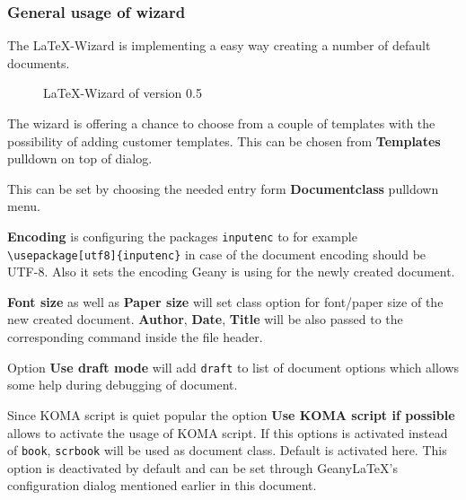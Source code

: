 \documentclass[%
paper=a4,%
fontsize=11pt,%
twoside=false,%
DIV18,%
headsepline,%
plainheadsepline,%
footsepline,%
plainfootsepline,%
bibliography=totoc,%
listof=totoc,%
BCOR10mm,%
parskip=half,%
openany,%
]{scrartcl}
\begin{document}
\subsubsection{General usage of wizard}
The \LaTeX-Wizard is implementing a easy way creating a number of
default documents.
\begin{figure}[h!]
	\caption{\LaTeX-Wizard of version 0.5}
\end{figure}

The wizard is offering a chance to choose from a couple of templates
with the possibility of adding customer templates. This can be
chosen from \textbf{Templates} pulldown on top of dialog.

This can be set by choosing the needed entry form
\textbf{Documentclass} pulldown menu.

\textbf{Encoding} is configuring the packages \texttt{inputenc} to
for example \texttt{\textbackslash usepackage[utf8]\{inputenc\}} in
case of the document encoding should be UTF-8. Also it sets the
encoding Geany is using for the newly created document.

\textbf{Font size} as well as \textbf{Paper size} will set class option
for font/paper size of the new created document. \textbf{Author},
\textbf{Date}, \textbf{Title} will be also passed to the corresponding
command inside the file header.

Option \textbf{Use draft mode} will add \texttt{draft} to list of
document options which allows some help during debugging of document.

Since KOMA script is quiet popular the option \textbf{Use KOMA script
if possible} allows to activate the usage of KOMA script. If this
options is activated instead of \texttt{book}, \texttt{scrbook} will
be used as document class. Default is activated here. This option is
deactivated by default and can be set through Geany\LaTeX{}'s
configuration dialog mentioned earlier in this document.
\end{document}
